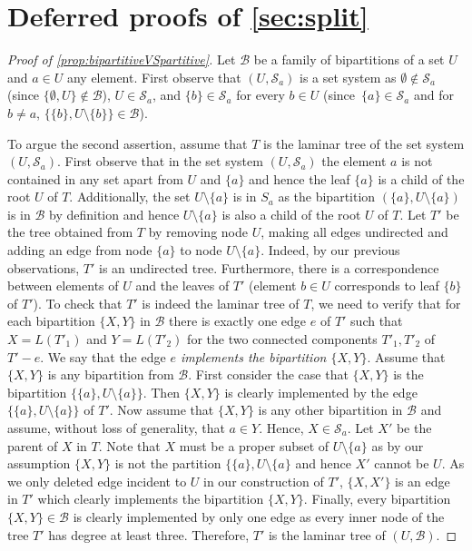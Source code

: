 \documentclass{lmcs} %
\begin{document}
\section{Deferred proofs of \autoref{sec:split}}
\begin{proof}[Proof of \autoref{prop:bipartitiveVSpartitive}]
    Let $\mathcal{B}$ be a family of bipartitions of a set $U$ and $a\in U$ any element.
    First observe that $(U,\mathcal{S}_a)$ is a set system
    as $\emptyset\notin \mathcal{S}_a$ (since $\{\emptyset,U\}\notin \mathcal{B}$),
    $U\in \mathcal{S}_a$,
    and $\{b\}\in \mathcal{S}_a$ for every $b\in U$ (since~$\{a\}\in\mathcal{S}_a$ and for~$b\neq a$, $\{\{b\},U\setminus \{b\}\}\in \mathcal{B}$).

    To argue the second assertion, assume that $T$ is the laminar tree of the set system $(U,\mathcal{S}_a)$. First observe that in the set system $(U,\mathcal{S}_a)$ the element $a$ is not contained in any set apart from $U$ and $\{a\}$ and hence the leaf $\{a\}$ is a child of the root $U$ of $T$. Additionally, the set $U\setminus \{a\}$ is in $S_a$ as the bipartition $(\{a\},U\setminus \{a\})$ is in $\mathcal{B}$ by definition and hence $U\setminus \{a\}$ is also a child of the root $U$ of $T$. Let $T'$ be the tree obtained from $T$ by removing node $U$, making all edges undirected and adding an edge from node $\{a\}$ to node $U\setminus \{a\}$. Indeed, by our previous observations, $T'$ is an undirected tree. Furthermore, there is a correspondence between elements of $U$ and the leaves of $T'$ (element $b\in U$ corresponds to leaf $\{b\}$ of $T'$). To check that $T'$ is indeed the laminar tree of $T$, we need to verify that for each bipartition $\{X,Y\}$ in $\mathcal{B}$ there is exactly one edge $e$ of $T'$ such that $X=L(T'_1)$ and $Y=L(T'_2)$ for the two connected components $T'_1,T'_2$ of $T'-e$. We say that the edge \emph{$e$ implements the bipartition $\{X,Y\}$}.
    Assume that $\{X,Y\}$ is any bipartition from $\mathcal{B}$. First consider the case that $\{X,Y\}$ is the bipartition $\{\{a\},U\setminus\{a\}\}$. Then $\{X,Y\}$ is clearly implemented by the edge $\{\{a\},U\setminus\{a\}\}$ of $T'$. Now assume that $\{X,Y\}$ is any other bipartition in $\mathcal{B}$ and assume, without loss of generality, that $a\in Y$. Hence, $X\in \mathcal{S}_a$. Let $X'$ be the parent of $X$ in $T$. Note that $X$ must be a proper subset of $U\setminus \{a\}$ as by our assumption $\{X,Y\}$ is not the partition $\{\{a\},U\setminus \{a\}$ and hence $X'$ cannot be $U$. As we only deleted edge incident to $U$ in our construction of $T'$, $\{X,X'\}$ is an edge in $T'$ which clearly implements the bipartition $\{X,Y\}$. Finally, every bipartition $\{X,Y\}\in \mathcal{B}$ is clearly implemented by only one edge as every inner node of the tree $T'$ has degree at least three. Therefore, $T'$ is the laminar tree of $(U,\mathcal{B})$.
\end{proof}
\end{document}
